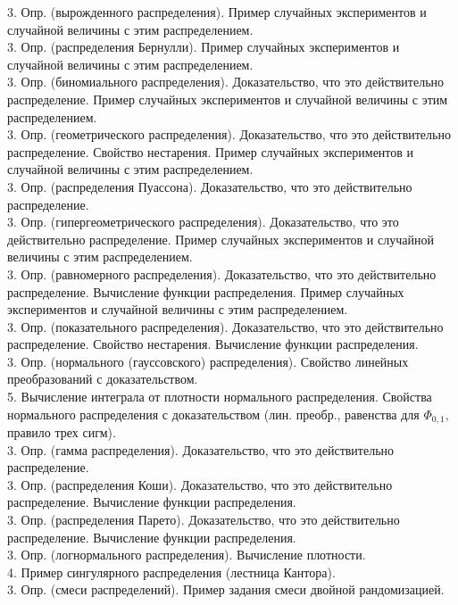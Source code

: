 \documentclass[10pt]{amsart}
\begin{document}
\begin{enumerate}
\begin{enumerate}
3. Опр. (вырожденного распределения). Пример случайных экспериментов и случайной величины с этим распределением. \\
3. Опр. (распределения Бернулли).  Пример случайных экспериментов и случайной величины с этим распределением. \\
3. Опр. (биномиального распределения). Доказательство, что это действительно распределение. Пример случайных экспериментов и случайной величины с этим распределением. \\     
3. Опр. (геометрического распределения). Доказательство, что это действительно распределение. Свойство нестарения. Пример случайных экспериментов и случайной величины с этим распределением. \\      
3. Опр. (распределения Пуассона). Доказательство, что это действительно распределение. \\
3. Опр. (гипергеометрического распределения). Доказательство, что это действительно распределение. Пример случайных экспериментов и случайной величины с этим распределением. \\      
3. Опр. (равномерного распределения). Доказательство, что это действительно распределение. Вычисление функции распределения. Пример случайных экспериментов и случайной величины с этим распределением. \\
3. Опр. (показательного распределения). Доказательство, что это действительно распределение. Свойство нестарения. Вычисление функции распределения. \\  
3. Опр. (нормального (гауссовского) распределения). Свойство линейных преобразований с доказательством. \\
5. Вычисление интеграла от плотности нормального распределения.  Свойства нормального распределения с доказательством (лин. преобр., равенства для $\Phi_{0,1},$ правило трех сигм). \\
3. Опр. (гамма распределения). Доказательство, что это действительно распределение. \\
3. Опр. (распределения Коши). Доказательство, что это действительно распределение. Вычисление функции распределения. \\
3. Опр. (распределения Парето). Доказательство, что это действительно распределение. Вычисление функции распределения. \\
3. Опр. (логнормального распределения). Вычисление плотности. \\
4. Пример сингулярного распределения (лестница Кантора). \\
3. Опр. (смеси распределений). Пример задания смеси двойной рандомизацией. \\


\end{enumerate}
\end{enumerate}
\end{document}
